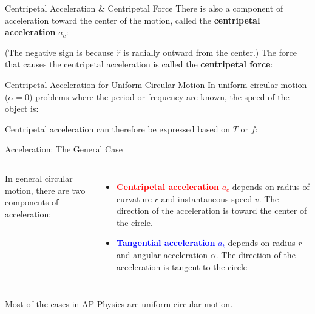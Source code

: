 \documentclass[12pt,compress,aspectratio=169]{beamer}
\begin{document}
\begin{frame}{Centripetal Acceleration \& Centripetal Force}
  There is also a component of acceleration toward the center of the motion,
  called the \textbf{centripetal acceleration} $a_c$:


  (The negative sign is because $\hat r$ is radially outward from the center.)
  The force that causes the centripetal acceleration is called the
  \textbf{centripetal force}:

\end{frame}



\begin{frame}{Centripetal Acceleration for Uniform Circular Motion}
  In uniform circular motion ($\alpha=0$) problems where the period or
  frequency are known, the speed of the object is:


  Centripetal acceleration can therefore be expressed based on $T$ or $f$:

\end{frame}



\begin{frame}{Acceleration: The General Case}
  \begin{columns}
    
    In general circular motion, there are two components of acceleration:
    \begin{itemize}
    \item\textcolor{red}{\textbf{Centripetal acceleration} $a_c$} depends on
      radius of curvature $r$ and instantaneous speed $v$. The direction of
      the acceleration is toward the center of the circle.
    \item \textcolor{blue}{\textbf{Tangential acceleration} $a_t$}
      depends on radius $r$  and angular acceleration $\alpha$. The direction
      of the acceleration is tangent to the circle
    \end{itemize}
  \end{columns}

  \vspace{.2in}Most of the cases in AP Physics are uniform circular motion.
\end{frame}
\end{document}
